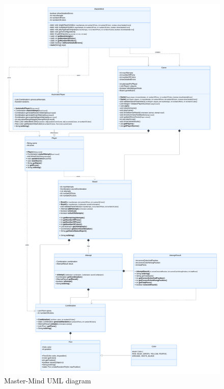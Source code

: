 \documentclass[english,a4paper]{article}
\begin{document}
\begin{figure}[t]
\caption{Master-Mind UML diagram}
	\centering
	\includegraphics[scale=0.170]{MasterMind.png}
\end{figure}
\end{document}
